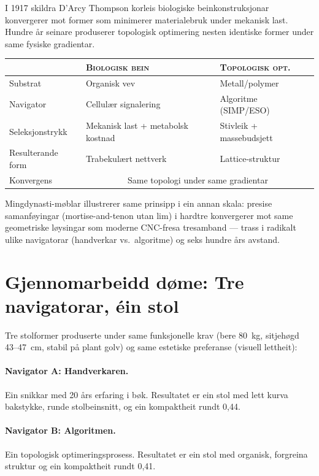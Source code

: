 I 1917 skildra D'Arcy Thompson korleis biologiske
beinkonstruksjonar konvergerer mot former som minimerer
materialebruk under mekanisk last. Hundre år seinare produserer
topologisk optimering nesten identiske former under same fysiske
gradientar.

\medskip
\begin{center}
{\footnotesize
\begin{tabular}{@{}lp{30mm}p{30mm}@{}}
\toprule
& \textsc{Biologisk bein} & \textsc{Topologisk opt.} \\
\midrule
Substrat & Organisk vev & Metall/polymer \\
Navigator & Cellulær signalering & Algoritme (SIMP/ESO) \\
Seleksjonstrykk & Mekanisk last + metabolsk kostnad
  & Stivleik + massebudsjett \\
Resulterande form & Trabekulært nettverk & Lattice-struktur \\
Konvergens & \multicolumn{2}{c}{Same topologi under same gradientar} \\
\bottomrule
\end{tabular}
}
\end{center}

\medskip
Mingdynasti-møblar illustrerer same prinsipp i ein annan skala:
presise samanføyingar (mortise-and-tenon utan lim) i hardtre
konvergerer mot same geometriske løysingar som moderne CNC-fresa
tresamband --- trass i radikalt ulike navigatorar (handverkar vs.\
algoritme) og seks hundre års avstand.


\section{Gjennomarbeidd døme: Tre navigatorar, éin stol}

Tre stolformer produserte under same funksjonelle krav (bere
80~kg, sitjehøgd 43--47~cm, stabil på plant golv) og same
estetiske preferanse (visuell lettheit):

\paragraph{Navigator A: Handverkaren.}
Ein snikkar med 20 års erfaring i bøk. Resultatet er ein stol med
lett kurva bakstykke, runde stolbeinsnitt, og ein kompaktheit
rundt 0{,}44.

\paragraph{Navigator B: Algoritmen.}
Ein topologisk optimeringsprosess. Resultatet er ein stol med
organisk, forgreina struktur og ein kompaktheit rundt 0{,}41.

